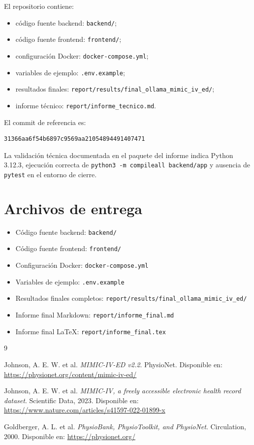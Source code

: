 \documentclass[12pt,a4paper]{article}
\begin{document}
El repositorio contiene:

\begin{itemize}
    \item código fuente backend: \texttt{backend/};
    \item código fuente frontend: \texttt{frontend/};
    \item configuración Docker: \texttt{docker-compose.yml};
    \item variables de ejemplo: \texttt{.env.example};
    \item resultados finales: \texttt{report/results/final\_ollama\_mimic\_iv\_ed/};
    \item informe técnico: \texttt{report/informe\_tecnico.md}.
\end{itemize}

El commit de referencia es:

\begin{verbatim}
31366aa6f54b6897c9569aa21054894491407471
\end{verbatim}

La validación técnica documentada en el paquete del informe indica Python 3.12.3, ejecución correcta de \texttt{python3 -m compileall backend/app} y ausencia de \texttt{pytest} en el entorno de cierre.

\section{Archivos de entrega}

\begin{itemize}
    \item Código fuente backend: \texttt{backend/}
    \item Código fuente frontend: \texttt{frontend/}
    \item Configuración Docker: \texttt{docker-compose.yml}
    \item Variables de ejemplo: \texttt{.env.example}
    \item Resultados finales completos: \texttt{report/results/final\_ollama\_mimic\_iv\_ed/}
    \item Informe final Markdown: \texttt{report/informe\_final.md}
    \item Informe final \LaTeX: \texttt{report/informe\_final.tex}
\end{itemize}

\begin{thebibliography}{9}

Johnson, A. E. W. et al.
\textit{MIMIC-IV-ED v2.2}.
PhysioNet.
Disponible en: \url{https://physionet.org/content/mimic-iv-ed/}

Johnson, A. E. W. et al.
\textit{MIMIC-IV, a freely accessible electronic health record dataset}.
Scientific Data, 2023.
Disponible en: \url{https://www.nature.com/articles/s41597-022-01899-x}

Goldberger, A. L. et al.
\textit{PhysioBank, PhysioToolkit, and PhysioNet}.
Circulation, 2000.
Disponible en: \url{https://physionet.org/}

\end{thebibliography}
\end{document}

